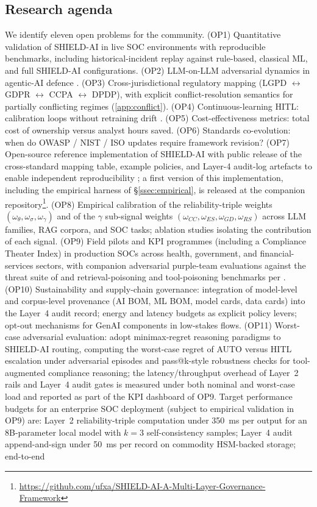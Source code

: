 \documentclass[preprint,12pt,authoryear]{elsarticle}
\begin{document}
\subsection{Research agenda}
\label{ssec:agenda}
We identify eleven open problems for the community. (OP1) Quantitative validation of SHIELD-AI in live SOC environments with reproducible benchmarks, including historical-incident replay against rule-based, classical ML, and full SHIELD-AI configurations. (OP2) LLM-on-LLM adversarial dynamics in agentic-AI defence \citep{owasp2025agentic,lga2026}. (OP3) Cross-jurisdictional regulatory mapping (LGPD $\leftrightarrow$ GDPR $\leftrightarrow$ CCPA $\leftrightarrow$ DPDP), with explicit conflict-resolution semantics for partially conflicting regimes (\ref{app:conflict}). (OP4) Continuous-learning HITL: calibration loops without retraining drift \citep{llmsoc2025}. (OP5) Cost-effectiveness metrics: total cost of ownership versus analyst hours saved. (OP6) Standards co-evolution: when do OWASP / NIST / ISO updates require framework revision? (OP7) Open-source reference implementation of SHIELD-AI with public release of the cross-standard mapping table, example policies, and Layer-4 audit-log artefacts to enable independent reproducibility \citep{lang2026}; a first version of this implementation, including the empirical harness of §\ref{ssec:empirical}, is released at the companion repository\footnote{\url{https://github.com/ufxa/SHIELD-AI-A-Multi-Layer-Governance-Framework}}. (OP8) Empirical calibration of the reliability-triple weights $(\omega_\theta, \omega_\sigma, \omega_\gamma)$ and of the $\gamma$ sub-signal weights $(\omega_{CC}, \omega_{ES}, \omega_{GD}, \omega_{RS})$ across LLM families, RAG corpora, and SOC tasks; ablation studies isolating the contribution of each signal. (OP9) Field pilots and KPI programmes (including a Compliance Theater Index) in production SOCs across health, government, and financial-services sectors, with companion adversarial purple-team evaluations against the threat suite of \citet{liu2024formalizing,greshake2023indirect,zou2023universal} and retrieval-poisoning and tool-poisoning benchmarks per \citet{lga2026,4c2026,airt_migt2026}. (OP10) Sustainability and supply-chain governance: integration of model-level and corpus-level provenance (AI BOM, ML BOM, model cards, data cards) into the Layer~4 audit record; energy and latency budgets as explicit policy levers; opt-out mechanisms for GenAI components in low-stakes flows. (OP11) Worst-case adversarial evaluation: adopt minimax-regret reasoning paradigms to SHIELD-AI routing, computing the worst-case regret of AUTO versus HITL escalation under adversarial episodes and pass@k-style robustness checks for tool-augmented compliance reasoning; the latency/throughput overhead of Layer~2 rails and Layer~4 audit gates is measured under both nominal and worst-case load and reported as part of the KPI dashboard of OP9. Target performance budgets for an enterprise SOC deployment (subject to empirical validation in OP9) are: Layer~2 reliability-triple computation under 350~ms per output for an 8B-parameter local model with $k=3$ self-consistency samples; Layer~4 audit append-and-sign under 50~ms per record on commodity HSM-backed storage; end-to-end 
\end{document}
